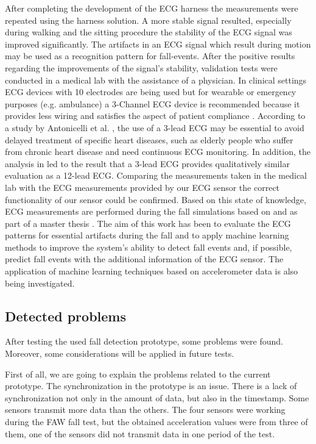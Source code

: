 \documentclass[10pt,journal,compsoc]{IEEEtran}
\begin{document}
After completing the development of the ECG harness the measurements were repeated using the harness solution. A more stable signal resulted, especially during walking and the sitting procedure the stability of the ECG signal was improved significantly. The artifacts in an ECG signal which result during motion may be used as a recognition pattern for fall-events. After the positive results regarding the improvements of the signal's stability, validation tests were conducted in a medical lab with the assistance of a physician. In clinical settings ECG devices with 10 electrodes are being used but for wearable or emergency purposes (e.g. ambulance) a 3-Channel ECG device is recommended because it provides less wiring and satisfies the aspect of patient compliance \cite{DrNicoletteWagner}. According to a study by Antonicelli et al. \cite{Antonicelli-ECG}, the use of a 3-lead ECG may be essential to avoid delayed treatment of specific heart diseases, such as elderly people who suffer from chronic heart disease and need continuous ECG monitoring. In addition, the analysis in \cite{Antonicelli-ECG} led to the result that a 3-lead ECG provides qualitatively similar evaluation as a 12-lead ECG. Comparing the measurements taken in the medical lab with the ECG measurements provided by our ECG sensor the correct functionality of our sensor could be confirmed. Based on this state of knowledge, ECG measurements are performed during the fall simulations based on \cite{Li2009} and \cite{Pannurat2014} as part of a master thesis \cite{FatimaMasterThesis}. The aim of this work has been to evaluate the ECG patterns for essential artifacts during the fall and to apply machine learning methods to improve the system's ability to detect fall events and, if possible, predict fall events with the additional information of the ECG sensor. The application of machine learning techniques based on accelerometer data is also being investigated. 

\subsection{Detected problems}
\label{sub:detectedproblems}

After testing the used fall detection prototype, some problems were 
found. Moreover, some considerations will be applied in future tests.

First of all, we are going to explain the problems related to the current prototype. The synchronization in the prototype is an issue. There is a lack of synchronization not only in the amount of data, but also in the timestamp. Some sensors transmit more data than the others. The four sensors were working during the FAW fall test, but the obtained acceleration values were from three of them, one of the sensors did not transmit data in one period of the test. 
\end{document}

